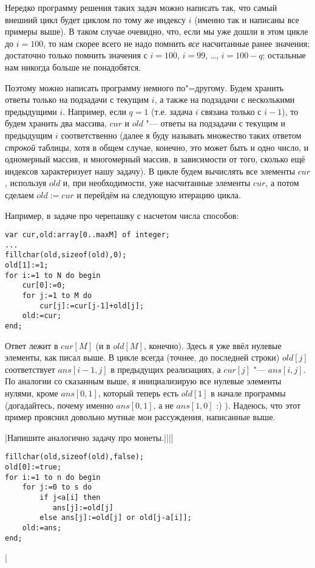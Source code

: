 Нередко программу решения таких задач можно написать так, что самый внешний цикл будет циклом по тому же индексу $i$ (именно так и 
написаны все примеры выше). В таком случае очевидно, что, если мы уже дошли в этом цикле до $i=100$, 
то нам скорее всего не надо помнить \textit{все} насчитанные ранее значения; достаточно только помнить значения с
$i=100$, $i=99$, \dots, $i=100-q$; остальные нам никогда больше не понадобятся.

Поэтому можно написать программу немного по"=другому. Будем хранить ответы только на подзадачи с текущим $i$, а также на подзадачи
с несколькими предыдущими $i$. Например, если $q=1$ (т.е. задача $i$ связана только с $i-1$), то будем хранить два массива,
$cur$ и $old$ "--- ответы на подзадачи с текущим и предыдущим $i$ соответственно (далее я буду называть множество таких ответом 
\textit{строкой} таблицы, хотя в общем случае, конечно, это может быть и одно число, и одномерный массив, и многомерный массив,
в зависимости от того, сколько ещё индексов характеризует нашу задачу). В цикле будем вычислять все элементы $cur$, используя
$old$ и, при необходимости, уже насчитанные элементы $cur$, а потом сделаем $old:=cur$ и перейдём на следующую итерацию цикла.

Например, в задаче про черепашку с насчетом числа способов:
\begin{codesampleo}\begin{verbatim}
var cur,old:array[0..maxM] of integer;
...
fillchar(old,sizeof(old),0);
old[1]:=1;
for i:=1 to N do begin
    cur[0]:=0;
    for j:=1 to M do
        cur[j]:=cur[j-1]+old[j];
    old:=cur;
end;
\end{verbatim}\end{codesampleo}
Ответ лежит в $cur[M]$ (и в $old[M]$, конечно). Здесь я уже ввёл нулевые элементы, как писал выше. В цикле всегда
(точнее, до последней строки) $old[j]$ соответствует $ans[i-1,j]$ в предыдущих реализациях, а $cur[j]$ "--- $ans[i,j]$.
По аналогии со сказанным выше, я инициализирую все нулевые элементы нулями, кроме $ans[0,1]$, который теперь есть
$old[1]$ в начале программы (догадайтесь, почему именно $ans[0,1]$, а не $ans[1,0]$ :) ). Надеюсь, что этот пример прояснил
довольно мутные мои рассуждения, написанные выше.

\task|Напишите аналогично задачу про монеты.||||
\begin{codesampleo}\begin{verbatim}
fillchar(old,sizeof(old),false);
old[0]:=true;
for i:=1 to n do begin
    for j:=0 to s do
        if j<a[i] then
           ans[j]:=old[j]
        else ans[j]:=old[j] or old[j-a[i]];
    old:=ans;
end;
\end{verbatim}\end{codesampleo}
|


